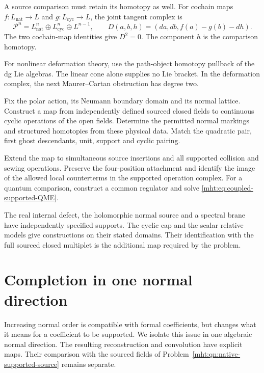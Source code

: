 A source comparison must retain its homotopy as well.
For cochain maps $f:L_{\mathrm{nat}}\to L$ and
$g:L_{\mathrm{cyc}}\to L$, the joint tangent complex is
\[
 \mathcal P^n=L_{\mathrm{nat}}^n\oplus L_{\mathrm{cyc}}^n
                      \oplus L^{n-1},
 \qquad
 D(a,b,h)=(da,db,f(a)-g(b)-dh).
\]
The two cochain-map identities give $D^2=0$.
The component $h$ is the comparison homotopy.

For nonlinear deformation theory, use the path-object
homotopy pullback of the dg Lie algebras. The linear
cone alone supplies no Lie bracket. In the deformation
complex, the next Maurer--Cartan obstruction has degree two.

\begin{problem}\label{mht:qn:native-supported-source}
Fix the polar action, its Neumann boundary domain and
its normal lattice. Construct a map from independently
defined sourced closed fields to continuous cyclic
operations of the open fields. Determine the
permitted normal markings and structured homotopies from
these physical data. Match the quadratic pair, first
ghost descendants, unit, support and cyclic pairing.

Extend the map to simultaneous source insertions and
all supported collision and sewing operations. Preserve
the four-position attachment and identify the image of
the allowed local counterterms in the supported operation
complex. For a quantum comparison, construct a common
regulator and solve \eqref{mht:eq:coupled-supported-QME}.
\end{problem}

The real internal defect, the holomorphic normal source
and a spectral brane have independently specified supports.
The cyclic cap and the scalar relative models give
constructions on their stated domains. Their identification
with the full sourced closed multiplet is the additional
map required by the problem.

\section{Completion in one normal direction}
\label{mht:sec:adic-normal}

Increasing normal order is compatible with formal coefficients,
but changes what it means for a coefficient to be supported.
We isolate this issue in one algebraic normal direction.
The resulting reconstruction and convolution have explicit
maps. Their comparison with the sourced fields of
Problem~\ref{mht:qn:native-supported-source} remains separate.

